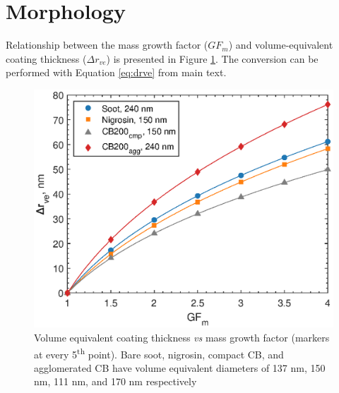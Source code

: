 \documentclass[12pt]{article}
\begin{document}



\section{Morphology}


Relationship between the mass growth factor ($GF_m$) and volume-equivalent coating thickness ($\Delta r_{ve}$) is presented in Figure \ref{s:fig:drve}. The conversion can be performed with Equation \ref{eq:drve} from main text.

\begin{figure}[htp]
\centering
\includegraphics[scale=0.7]{fig_supp_drve.eps}
\caption{Volume equivalent coating thickness \textit{vs} mass growth factor (markers at every 5\textsuperscript{th} point). Bare soot, nigrosin, compact CB, and agglomerated CB have volume equivalent diameters of 137 nm, 150 nm, 111 nm, and 170 nm respectively}
\label{s:fig:drve}
\end{figure}
\end{document}
